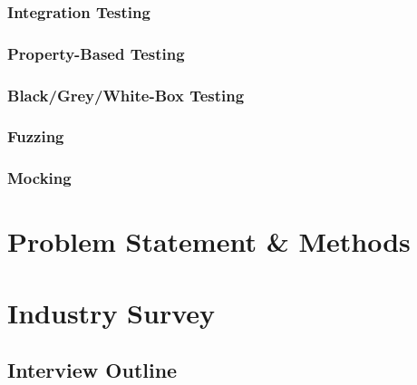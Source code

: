 \documentclass[12pt]{report}
\begin{document}
\subsection{Integration Testing} %

\subsection{Property-Based Testing} %

\subsection{Black/Grey/White-Box Testing} %

\subsection{Fuzzing} %

\subsection{Mocking} %

\chapter{Problem Statement \& Methods} %

\chapter{Industry Survey} %

\section{Interview Outline} %
\end{document}
